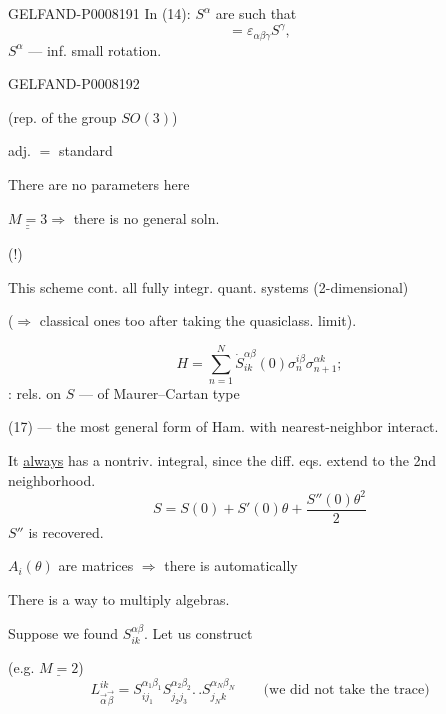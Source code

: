 \begin{GelfandAdjacentEvidence}{GELFAND-P000819}{1}
In (14): \(S^\alpha\) are such that
\begin{equation*}
[S^\alpha,S^\beta]=\varepsilon_{\alpha\beta\gamma}S^\gamma,\tag{16}
\end{equation*}
\(S^\alpha\) — inf. small rotation.
\end{GelfandAdjacentEvidence}
\begin{GelfandAdjacentEvidence}{GELFAND-P000819}{2}


(rep. of the group \(SO(3)\))

adj. \(=\) standard

There are no parameters here

\(\underline{\underline{M=3}}\Rightarrow\) there is no general soln.

(!) 

This scheme cont. all fully integr. quant. systems (2-dimensional)

(\(\Rightarrow\) classical ones too after taking the quasiclass. limit).

\begin{equation*}
H=\sum_{n=1}^{N}\dot S_{ik}^{\alpha\beta}(0)
 \sigma_n^{i\beta}\sigma_{n+1}^{\alpha k};\tag{17}
\end{equation*}
: rels. on \(S\) — of Maurer–Cartan type

(17) — the most general form of Ham. with nearest-neighbor interact.

It \uline{always} has a nontriv. integral, since the diff. eqs. extend to the 2nd neighborhood.
\[
S=S(0)+S'(0)\theta+\frac{S''(0)\theta^2}{2}
\]
\(S''\) is recovered.

\(A_i(\theta)\) are matrices \(\Rightarrow\) there is  automatically

There is a way to multiply algebras.

Suppose we found \(S_{ik}^{\alpha\beta}\). Let us construct

(e.g. \(\underline{M=2}\))
\begin{equation*}
 L^{ik}_{\vec\alpha\vec\beta}
 =S_{ij_1}^{\alpha_1\beta_1}S_{j_2j_3}^{\alpha_2\beta_2}.\, .
 S_{j_Nk}^{\alpha_N\beta_N}
 \qquad\text{(we did not take the trace)}\tag{18}
\end{equation*}
\end{GelfandAdjacentEvidence}
